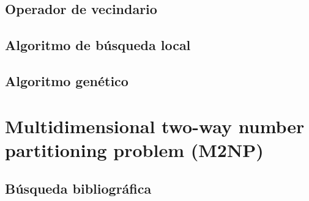 \documentclass[13pt,a4paper]{article}
\begin{document}




\subsection{Operador de vecindario}

\subsection{Algoritmo de búsqueda local}

\subsection{Algoritmo genético}


\section{Multidimensional two-way number partitioning problem (M2NP)}

\subsection{Búsqueda bibliográfica}
\end{document}
